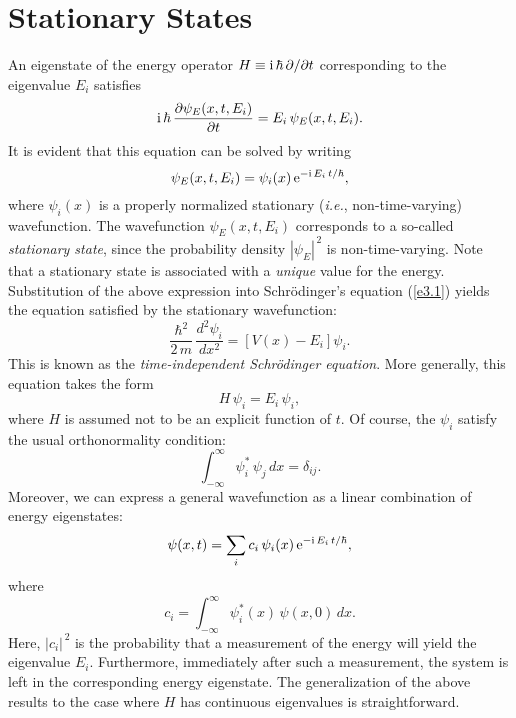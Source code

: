 \section{Stationary States}\label{sstat}
An eigenstate of the energy operator $H\equiv {\rm i}\,\hbar\,\partial/\partial t$
corresponding to the eigenvalue $E_i$ satisfies
\begin{equation}
{\rm i}\,\hbar\,\frac{\partial \psi_E(x,t,E_i)}{\partial t} = E_i\,\psi_E(x,t,E_i).
\end{equation}
It is evident that this equation can be solved by writing
\begin{equation}
\psi_E(x,t,E_i) = \psi_i(x)\,{\rm e}^{-{\rm i}\,E_i\,t/\hbar},
\end{equation}
where $\psi_i(x)$ is a properly normalized stationary ({\em i.e.}, non-time-varying) wavefunction. The wavefunction $\psi_E(x,t,E_i)$  corresponds to a so-called  {\em stationary state}, since
the probability density $|\psi_E|^{\,2}$ is non-time-varying. Note that
a stationary state is associated with a {\em unique}\/ value for the energy.
Substitution of the above expression into Schr\"{o}dinger's equation (\ref{e3.1}) yields the equation satisfied by the
stationary wavefunction:
\begin{equation}\label{etimeii}
\frac{\hbar^2}{2\,m}\,\frac{d^2 \psi_i}{d x^2} = 
\left[V(x)-E_i\right]\psi_i.
\end{equation}
This is known as the {\em time-independent Schr\"{o}dinger equation}. 
More generally, this equation takes the form
\begin{equation}\label{etimei}
H\,\psi_i = E_i\,\psi_i,
\end{equation}
where $H$ is assumed not to be an explicit function of $t$.
Of course, the $\psi_i$ satisfy the usual orthonormality condition:
\begin{equation}\label{e4.157}
\int_{-\infty}^\infty \psi_i^\ast\,\psi_j\,dx = \delta_{ij}.
\end{equation}
Moreover, we can express a general wavefunction as a linear combination
of energy eigenstates:
\begin{equation}\label{e4.158}
\psi(x,t) = \sum_i c_i\,\psi_i(x)\,{\rm e}^{-{\rm i}\,E_i\,t/\hbar},
\end{equation}
where
\begin{equation}
c_i = \int_{-\infty}^{\infty} \psi_i^\ast(x)\,\psi(x,0)\,dx.
\end{equation}
Here, $|c_i|^{\,2}$ is the probability that a measurement of the energy will
yield the eigenvalue $E_i$. Furthermore, immediately after such a measurement, the system is left in the corresponding energy eigenstate.
The generalization of the above results to the case where $H$ has continuous
eigenvalues is straightforward.

